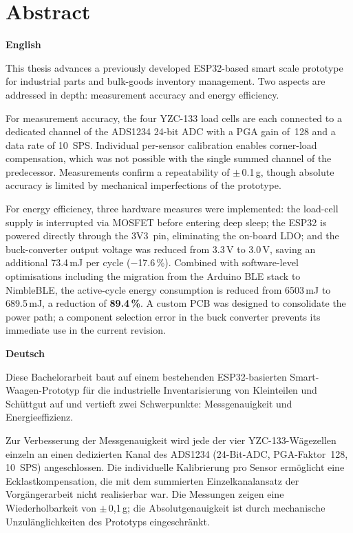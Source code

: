 \documentclass[12pt,a4paper]{article}
\begin{document}
	
	
	\newpage

	\section*{Abstract}

	\textbf{English}

	\medskip
	\noindent
	This thesis advances a previously developed ESP32-based smart scale prototype for industrial parts and bulk-goods inventory management.
	Two aspects are addressed in depth: measurement accuracy and energy efficiency.

	For measurement accuracy, the four YZC-133 load cells are each connected to a dedicated channel of the ADS1234 24-bit ADC with a PGA gain of~128 and a data rate of 10~SPS.
	Individual per-sensor calibration enables corner-load compensation, which was not possible with the single summed channel of the predecessor.
	Measurements confirm a repeatability of $\pm$\,0.1\,g, though absolute accuracy is limited by mechanical imperfections of the prototype.

	For energy efficiency, three hardware measures were implemented: the load-cell supply is interrupted via MOSFET before entering deep sleep; the ESP32 is powered directly through the 3V3~pin, eliminating the on-board LDO; and the buck-converter output voltage was reduced from 3.3\,V to 3.0\,V, saving an additional 73.4\,mJ per cycle ($-$17.6\,\%).
	Combined with software-level optimisations including the migration from the Arduino BLE stack to NimbleBLE, the active-cycle energy consumption is reduced from 6503\,mJ to 689.5\,mJ, a reduction of \textbf{89.4\,\%}.
	A custom PCB was designed to consolidate the power path; a component selection error in the buck converter prevents its immediate use in the current revision.

	\bigskip
	\textbf{Deutsch}

	\medskip
	\noindent
	Diese Bachelorarbeit baut auf einem bestehenden ESP32-basierten Smart-Waagen-Prototyp für die industrielle Inventarisierung von Kleinteilen und Schüttgut auf und vertieft zwei Schwerpunkte: Messgenauigkeit und Energieeffizienz.

	Zur Verbesserung der Messgenauigkeit wird jede der vier YZC-133-Wägezellen einzeln an einen dedizierten Kanal des ADS1234 (24-Bit-ADC, PGA-Faktor~128, 10~SPS) angeschlossen.
	Die individuelle Kalibrierung pro Sensor ermöglicht eine Ecklastkompensation, die mit dem summierten Einzelkanalansatz der Vorgängerarbeit nicht realisierbar war.
	Die Messungen zeigen eine Wiederholbarkeit von $\pm$\,0{,}1\,g; die Absolutgenauigkeit ist durch mechanische Unzulänglichkeiten des Prototyps eingeschränkt.
\end{document}
